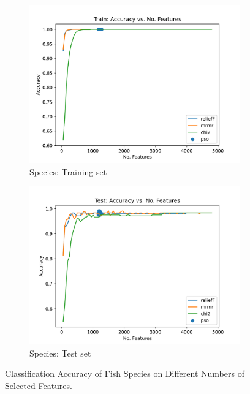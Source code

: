 \documentclass[runningheads]{llncs}
\begin{document}
\begin{figure}[t]
  \centering
  \begin{subfigure}[b]{.45\linewidth}
    \includegraphics[width=\linewidth]{accuracy-features-fish-train.png}
    \caption{Species: Training set}\label{fig:fs-per-k-fish-train}
  \end{subfigure}
  \begin{subfigure}[b]{.45\linewidth}
    \includegraphics[width=\linewidth]{accuracy-features-fish-test.png}
    \caption{Species: Test set}\label{fig:fs-per-k-fish-test}
  \end{subfigure}
  \caption[Two numerical solutions]{
      Classification Accuracy of Fish Species on Different Numbers of Selected Features.
    }
  \label{fig:fs-per-k-fish}
\end{figure}
\end{document}
